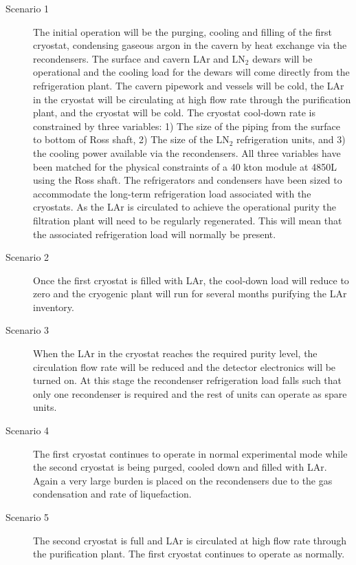\begin{description}
\item[Scenario 1]
The initial operation will be the purging, cooling and filling of the 
first cryostat, condensing gaseous argon in the cavern by heat exchange 
via the recondensers. The surface and cavern LAr and  LN$_2$ dewars 
will be operational and the cooling load for the dewars will come 
directly from the refrigeration plant. The cavern pipework and vessels 
will be cold, the LAr in the cryostat will be circulating at high flow 
rate through the purification plant, and the cryostat will be cold.
The cryostat cool-down rate is constrained by three variables: 1) The 
size of the piping from the surface to bottom of Ross shaft, 2) The 
size of the LN$_2$ refrigeration units, and 3) the cooling power 
available via the recondensers.  All three variables have been 
matched for the physical constraints of a 40 kton module at 4850L 
using the Ross shaft. The refrigerators and condensers have been 
sized to accommodate the long-term refrigeration load associated 
with the cryostats.  As the LAr is circulated to achieve the 
operational purity the filtration plant will need to be regularly 
regenerated. This will mean that the associated refrigeration 
load will normally be present.

\item[Scenario 2]
Once the first cryostat is filled with LAr, the cool-down load will 
reduce to zero and the cryogenic plant will run for several months 
purifying the LAr inventory.

\item[Scenario 3]
When the LAr in the cryostat reaches the required purity level, the 
circulation flow rate will be reduced and the detector electronics 
will be turned on.  At this stage the recondenser refrigeration 
load falls such that only one recondenser is required and the 
rest of units can operate as spare units.

\item[Scenario 4] The first cryostat continues to operate in normal
experimental mode 
while  the second cryostat is being purged, cooled down and 
filled with LAr. Again a very large burden is placed on the 
recondensers due to the gas condensation and rate of liquefaction.

\item[Scenario 5] The second cryostat is full and LAr is circulated 
at high flow rate through the purification plant. The first cryostat
continues to operate as normally.


\end{description}

